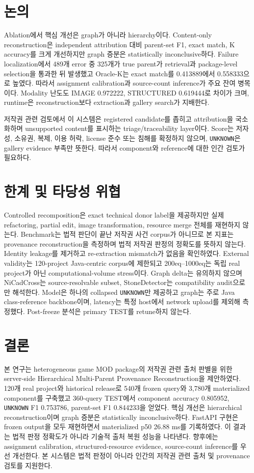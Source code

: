 \documentclass[runningheads]{llncs}
\begin{document}
\section{논의}
Ablation에서 핵심 개선은 graph가 아니라 hierarchy이다. Content-only reconstruction은 independent attribution 대비 parent-set F1, exact match, K accuracy를 크게 개선하지만 graph 증분은 statistically inconclusive하다. Failure localization에서 489개 error 중 325개가 true parent가 retrieval과 package-level selection을 통과한 뒤 발생했고 Oracle-K는 exact match를 0.413889에서 0.558333으로 높였다. 따라서 assignment calibration과 source-count inference가 주요 잔여 병목이다. Modality 난도도 IMAGE 0.972222, STRUCTURED 0.619444로 차이가 크며, runtime은 reconstruction보다 extraction과 gallery search가 지배한다.

저작권 관련 검토에서 이 시스템은 registered candidate를 좁히고 attribution을 국소화하며 unsupported content를 표시하는 triage/traceability layer이다. Score는 저자성, 소유권, 복제, 이용 허락, license 준수 또는 침해를 확정하지 않으며, \texttt{UNKNOWN}은 gallery evidence 부족만 뜻한다. 따라서 component와 reference에 대한 인간 검토가 필요하다.

\section{한계 및 타당성 위협}
Controlled recomposition은 exact technical donor label을 제공하지만 실제 refactoring, partial edit, image transformation, resource merge 전체를 재현하지 않는다. Benchmark는 법적 판단이 끝난 저작권 사건 corpus가 아니므로 본 지표는 provenance reconstruction을 측정하며 법적 저작권 판정의 정확도를 뜻하지 않는다. Identity leakage를 제거하고 re-extraction mismatch가 없음을 확인하였다. External validity는 120-project Java-centric corpus에 제한되고 200eq--1000eq는 독립 real project가 아닌 computational-volume stress이다. Graph delta는 유의하지 않으며 NiCadCross는 source-resolvable subset, StoneDetector는 compatibility audit으로만 해석한다. Model은 하나의 collapsed \texttt{UNKNOWN}만 제공하고 graph는 주로 Java class-reference backbone이며, latency는 특정 host에서 network upload를 제외해 측정했다. Post-freeze 분석은 primary TEST를 retune하지 않는다.

\section{결론}
본 연구는 heterogeneous game MOD package의 저작권 관련 출처 판별을 위한 server-side Hierarchical Multi-Parent Provenance Reconstruction을 제안하였다. 120개 real project와 historical release로 540개 frozen query와 3,780개 materialized component를 구축했고 360-query TEST에서 component accuracy 0.805952, \texttt{UNKNOWN} F1 0.753786, parent-set F1 0.844233을 얻었다. 핵심 개선은 hierarchical reconstruction이며 graph 증분은 statistically inconclusive하다. FastAPI 구현은 frozen output을 모두 재현하면서 materialized p50 26.88 ms를 기록하였다. 이 결과는 법적 판정 정확도가 아니라 기술적 출처 복원 성능을 나타낸다. 향후에는 assignment calibration, structured-resource evidence, source-count inference를 우선 개선한다. 본 시스템은 법적 판정이 아니라 인간의 저작권 관련 출처 및 provenance 검토를 지원한다.

\begingroup
\renewcommand\small{\fontsize{8}{8.5}\selectfont}


\endgroup
\end{document}
